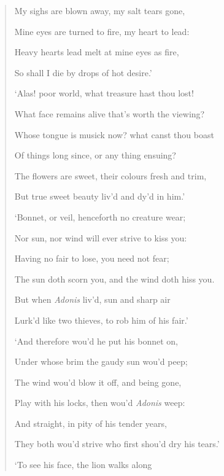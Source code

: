 \documentclass[a4paper, 11pt, oneside, polutonikogreek, english]{article}
\begin{document}
\begin{quotation}
My sighs are blown away, my salt tears gone,

Mine eyes are turned to fire, my heart to lead:

\hspace*{15mm}Heavy hearts lead melt at mine eyes as fire,

\hspace*{15mm}So shall I die by drops of hot desire.'

\bigskip

`Alas! poor world, what treasure hast thou lost!

What face remains alive that's worth the viewing?

Whose tongue is musick now? what canst thou boast

Of things long since, or any thing ensuing?

\hspace*{15mm}The flowers are sweet, their colours fresh and trim,

\hspace*{15mm}But true sweet beauty liv'd and dy'd in him.'

\bigskip

`Bonnet, or veil, henceforth no creature wear;

Nor sun, nor wind will ever strive to kiss you:

Having no fair to lose, you need not fear;

The sun doth scorn you, and the wind doth hiss you.

\hspace*{15mm}But when \emph{Adonis} liv'd, sun and sharp air

\hspace*{15mm}Lurk'd like two thieves, to rob him of his fair.'

\bigskip

`And therefore wou'd he put his bonnet on,

Under whose brim the gaudy sun wou'd peep;

The wind wou'd blow it off, and being gone,

Play with his locks, then wou'd \emph{Adonis} weep:

\hspace*{15mm}And straight, in pity of his tender years,

\hspace*{15mm}They both wou'd strive who first shou'd dry his tears.'

\bigskip

`To see his face, the lion walks along


\end{quotation}
\end{document}
